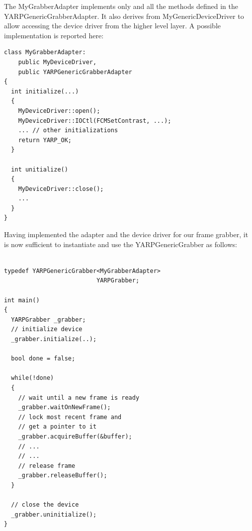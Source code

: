 The MyGrabberAdapter implements only and all the methods defined in the YARPGenericGrabberAdapter. It also derives from MyGenericDeviceDriver to allow accessing the device driver from the higher level layer. A possible implementation is reported here:

{\small \begin{verbatim}
class MyGrabberAdapter: 
	public MyDeviceDriver,
	public YARPGenericGrabberAdapter
{
  int initialize(...)
  {
    MyDeviceDriver::open();
    MyDeviceDriver::IOCtl(FCMSetContrast, ...);
    ... // other initializations
    return YARP_OK;
  }

  int unitialize()
  {
    MyDeviceDriver::close();
    ...
  }
}
\end{verbatim}}

Having implemented the adapter and the device driver for our frame grabber, it is now sufficient to instantiate and use the YARPGenericGrabber as follows:

{\small
\begin{verbatim}

typedef YARPGenericGrabber<MyGrabberAdapter> 
                          YARPGrabber;

int main()
{
  YARPGrabber _grabber;
  // initialize device
  _grabber.initialize(..);
  
  bool done = false;

  while(!done)
  {
    // wait until a new frame is ready
    _grabber.waitOnNewFrame();
    // lock most recent frame and
    // get a pointer to it
    _grabber.acquireBuffer(&buffer);
    // ...
    // ...
    // release frame
    _grabber.releaseBuffer();
  }

  // close the device
  _grabber.uninitialize();
}
\end{verbatim}
}